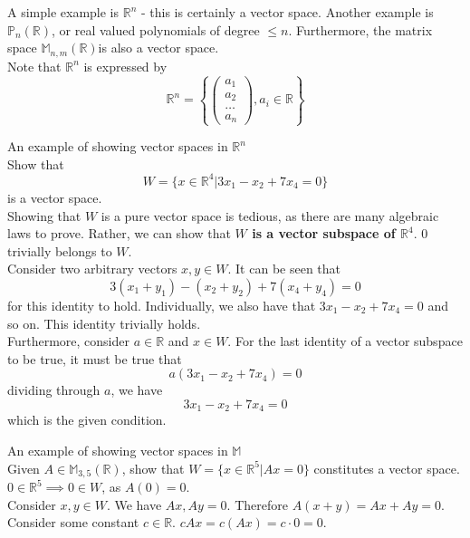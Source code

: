 \documentclass[journal, letterpaper]{IEEEtran}
\begin{document}
    A simple example is $\mathbb{R}^n$ - this is certainly a vector space. Another example is $\mathbb{P}_n(\mathbb{R})$, or real valued polynomials of degree $\le n$. Furthermore, the matrix space $\mathbb{M}_{n, m}(\mathbb{R})$is also a vector space.
    \newline \\ 
    Note that $\mathbb{R}^n$ is expressed by
    $$ \mathbb{R}^n = \left\{ \begin{pmatrix}
        a_1 \\ a_2 \\ \dots \\ a_n
    \end{pmatrix}, a_i \in \mathbb{R}\right\}$$
    \begin{myboxg}{An example of showing vector spaces in $\mathbb{R}^n$} \\ 
        Show that $$W = \{x \in \mathbb{R}^4 | 3x_1 - x_2 + 7x_4 = 0\}$$
        is a vector space.
        \newline \\ 
        Showing that $W$ is a pure vector space is tedious, as there are many algebraic laws to prove. Rather, we can show that \textbf{$W$ is a vector subspace of $\mathbb{R}^4$}. $0$ trivially belongs to $W$.
        \newline \\ 
        Consider two arbitrary vectors $x, y \in W$. It can be seen that 
        $$ 3(x_1 + y_1) - (x_2 + y_2) + 7(x_4 + y_4) = 0$$
        for this identity to hold. Individually, we also have that $3x_1 - x_2 + 7x_4 = 0$ and so on. This identity trivially holds.
        \newline \\ 
        Furthermore, consider $a \in \mathbb{R}$ and $x \in W$. For the last identity of a vector subspace to be true, it must be true that
        $$ a(3x_1 - x_2 + 7x_4) = 0$$
        dividing through $a$, we have
        $$ 3x_1 - x_2 + 7x_4 = 0$$
        which is the given condition.
    \end{myboxg}
    \begin{myboxg}{An example of showing vector spaces in $\mathbb{M}$} \\ 
        Given $A \in \mathbb{M}_{3, 5}(\mathbb{R})$, show that $W = \{ x \in \mathbb{R}^5 | Ax = 0\}$ constitutes a vector space.
        \newline \\
        $0 \in \mathbb{R}^5 \implies 0 \in W$, as $A(0) = 0$.
        \newline \\ 
        Consider $x, y \in W$. We have $Ax, Ay = 0$. Therefore $A(x + y) = Ax + Ay = 0$.
        \newline \\ 
        Consider some constant $c \in \mathbb{R}$. $cAx = c(Ax) = c\cdot 0 = 0$.
    \end{myboxg}
\end{document}
